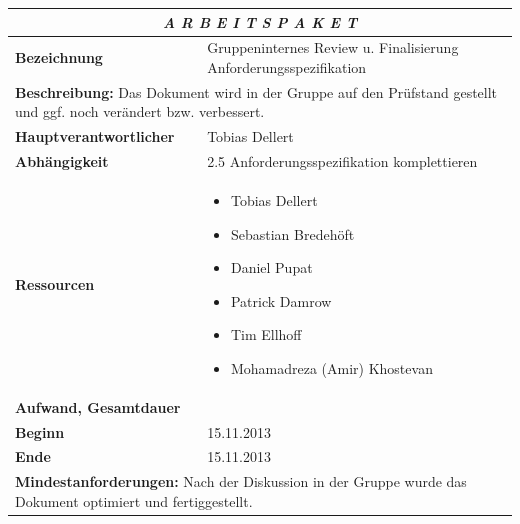 \documentclass[fontsize=12pt,paper=a4,twoside]{scrartcl}
\begin{document}
\begin{tabular}{p{7.5cm}|p{7.5cm}}\toprule
\multicolumn{2}{c}{\textbf{\textit{A R B E I T S P A K E T \quad 2.7}}} \\ \toprule \hline
\textbf{Bezeichnung} & Gruppeninternes Review u. Finalisierung Anforderungsspezifikation\\\hline
\multicolumn{2}{p{15cm}}{\textbf{Beschreibung:} \newline 
Das Dokument wird in der Gruppe auf den Prüfstand gestellt und ggf. noch verändert bzw. verbessert.}  \\\hline
\textbf{Hauptverantwortlicher} & Tobias Dellert \\\hline
\textbf{Abhängigkeit} & 2.5 Anforderungsspezifikation komplettieren\\\hline
\textbf{Ressourcen} & \begin{itemize} 
\itemsep0pt
\item Tobias Dellert
\item Sebastian Bredehöft
\item Daniel Pupat
\item Patrick Damrow
\item Tim Ellhoff
\item Mohamadreza (Amir) Khostevan
\end{itemize} \\\hline
\textbf{Aufwand, Gesamtdauer} & \\\hline
\textbf{Beginn} & 15.11.2013 \\\hline
\textbf{Ende} & 15.11.2013\\\hline
\multicolumn{2}{p{15cm}}{\textbf{Mindestanforderungen: } \newline
Nach der Diskussion in der Gruppe wurde das Dokument optimiert und fertiggestellt. }  \\ \toprule
\end{tabular} \\\\
\end{document}
